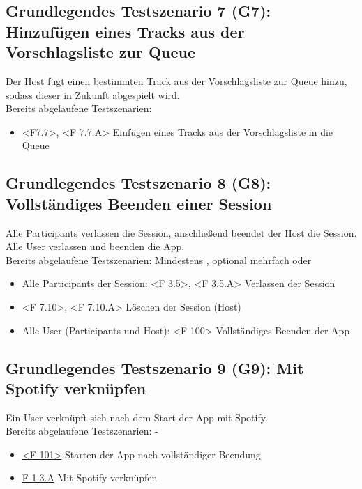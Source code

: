 \documentclass[oneside, ngerman]{sdqtechreport}
\begin{document}
\subsection{Grundlegendes Testszenario 7 (G7): Hinzufügen eines Tracks aus der Vorschlagsliste zur Queue}
\label{subsec:Tests:GrundlegendeTestszenarien:G7}
\hypertarget{G7}{}
\newcommand{\gSeven}{\hyperlink{G7}{G7: Hinzufügen eines Tracks aus der Vorschlagsliste zur Queue }}
Der Host fügt einen bestimmten Track aus der Vorschlagsliste zur Queue hinzu, sodass dieser in Zukunft abgespielt wird. \\
Bereits abgelaufene Testszenarien: \gOne
\begin{itemize}
    \item <F7.7>, <F 7.7.A> Einfügen eines Tracks aus der Vorschlagsliste in die Queue
\end{itemize}

\subsection{Grundlegendes Testszenario 8 (G8): Vollständiges Beenden einer Session}
\label{subsec:Tests:GrundlegendeTestszenarien:G8}
\hypertarget{G8}{}
\newcommand{\gEight}{\hyperlink{G8}{G8: Vollständiges Beenden einer Session }}
Alle Participants verlassen die Session, anschließend beendet der Host die Session. Alle User verlassen und beenden die App. \\
Bereits abgelaufene Testszenarien: Mindestens \gOne, optional mehrfach \gTwo oder \gThree
\begin{itemize}
    \item Alle Participants der Session: \hyperlink{<F 3.5>}{<F 3.5>}, <F 3.5.A> Verlassen der Session
    \item <F 7.10>, <F 7.10.A> Löschen der Session (Host)
    \item Alle User (Participants und Host): <F 100> Vollständiges Beenden der App
\end{itemize}


\subsection{Grundlegendes Testszenario 9 (G9): Mit Spotify verknüpfen}
\label{subsec:Tests:GrundlegendeTestszenarien:G9}
\hypertarget{G9}{}
\newcommand{\gNine}{\hyperlink{G9}{G9: Mit Spotify verknüpfen }}
Ein User verknüpft sich nach dem Start der App mit Spotify. \\
Bereits abgelaufene Testszenarien: -
\begin{itemize}
    \item \hyperlink{<F 101>}{<F 101>} Starten der App nach vollständiger Beendung
    \item \hyperlink{<F 1.3.A}{F 1.3.A} Mit Spotify verknüpfen
\end{itemize}
\end{document}
